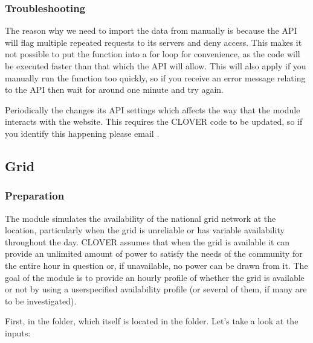\documentclass[letterpaper,10pt,english]{sphinxmanual}
\begin{document}
\noindent{}


\subsubsection{Troubleshooting}
\label{\detokenize{electricity_generation:troubleshooting}}
\sphinxAtStartPar
The reason why we need to import the data from 
manually is because the API will flag multiple repeated requests to its
servers and deny access. This makes it not possible to put the
 function into a for loop for
convenience, as the code will be executed faster than that which the API
will allow. This will also apply if you manually run the function too
quickly, so if you receive an error message relating to the API then
wait for around one minute and try again.

\sphinxAtStartPar
Periodically the  changes its API settings which
affects the way that the  module interacts with the website. This
requires the CLOVER code to be updated, so if you identify this
happening please email .


\subsection{Grid}
\label{\detokenize{electricity_generation:grid}}

\subsubsection{Preparation}
\label{\detokenize{electricity_generation:id1}}
\sphinxAtStartPar
The  module simulates the availability of the national grid
network at the location, particularly when the grid is unreliable or has
variable availability throughout the day. CLOVER assumes that when the
grid is available it can provide an unlimited amount of power to satisfy
the needs of the community for the entire hour in question or, if
unavailable, no power can be drawn from it. The goal of the 
module is to provide an hourly profile of whether the grid is available
or not by using a user\sphinxhyphen{}specified availability profile (or several of
them, if many are to be investigated).

\sphinxAtStartPar
First,  in the  folder,
which itself is located in the  folder. Let’s take a look at
the inputs:
\end{document}
